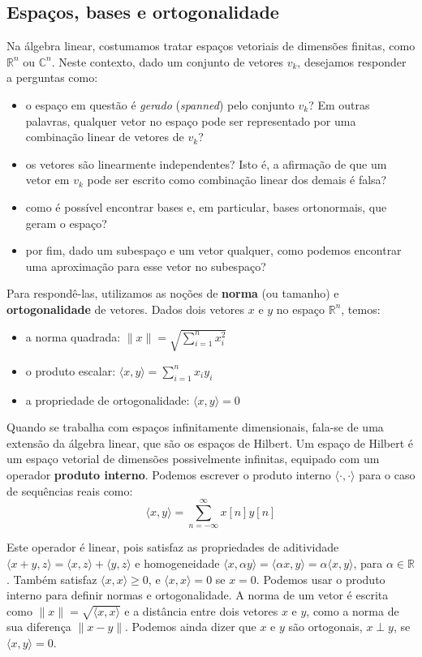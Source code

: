 \subsection*{Espaços, bases e ortogonalidade}
Na álgebra linear, costumamos tratar espaços vetoriais de dimensões finitas, como $\mathbb{R}^n$ ou $\mathbb{C}^n$. Neste contexto, dado um conjunto de vetores ${v_k}$, desejamos responder a perguntas como:
\begin{itemize}
    \item o espaço em questão é \emph{gerado} (\emph{spanned}) pelo conjunto ${v_k}$? Em outras palavras, qualquer vetor no espaço pode ser representado por uma combinação linear de vetores de ${v_k}$?
    \item os vetores são linearmente independentes? Isto é, a afirmação de que um vetor em ${v_k}$ pode ser escrito como combinação linear dos demais é falsa?
    \item como é possível encontrar bases e, em particular, bases ortonormais, que geram o espaço?
    \item por fim, dado um subespaço e um vetor qualquer, como podemos encontrar uma aproximação para esse vetor no subespaço?
\end{itemize}

Para respondê-las, utilizamos as noções de \textbf{norma} (ou tamanho) e \textbf{ortogonalidade} de vetores. Dados dois vetores $x$ e $y$ no espaço $\mathbb{R}^n$, temos:
\begin{itemize}
    \item a norma quadrada: $\|x\| = \sqrt{\sum_{i=1}^{n} x^2_i}$
    \item o produto escalar: $\langle x,y \rangle = \sum_{i=1}^{n} x_iy_i$
    \item a propriedade de ortogonalidade: $\langle x,y \rangle = 0$
\end{itemize}

Quando se trabalha com espaços infinitamente dimensionais, fala-se de uma extensão da álgebra linear, que são os espaços de Hilbert. Um espaço de Hilbert é um espaço vetorial de dimensões possivelmente infinitas, equipado com um operador \textbf{produto interno}. Podemos escrever o produto interno $\langle\cdot,\cdot\rangle$ para o caso de sequências reais como:
\begin{equation}
    \langle x,y \rangle = \sum_{n=-\infty}^{\infty} x[n]y[n]
    \label{equ:innerprod}
\end{equation}

Este operador é linear, pois satisfaz as propriedades de aditividade $\langle x+y,z \rangle = \langle x,z \rangle + \langle y,z \rangle$ e homogeneidade $\langle x,\alpha y \rangle = \langle \alpha x,y \rangle = \alpha\langle x,y \rangle$, para $\alpha \in \mathbb{R}$. Também satisfaz $\langle x,x \rangle \geq 0$, e $\langle x,x \rangle = 0$ se $x=0$. Podemos usar o produto interno para definir normas e ortogonalidade. A norma de um vetor é escrita como $\|x\| = \sqrt{\langle x,x \rangle}$ e a distância entre dois vetores $x$ e $y$, como a norma de sua diferença $\|x-y\|$. Podemos ainda dizer que $x$ e $y$ são ortogonais, $x\perp y$, se $\langle x,y \rangle = 0$.

